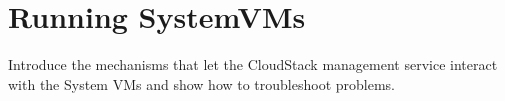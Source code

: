 \section{Running SystemVMs} 
Introduce the mechanisms that let the CloudStack management service interact with the System VMs and show how to troubleshoot problems.
